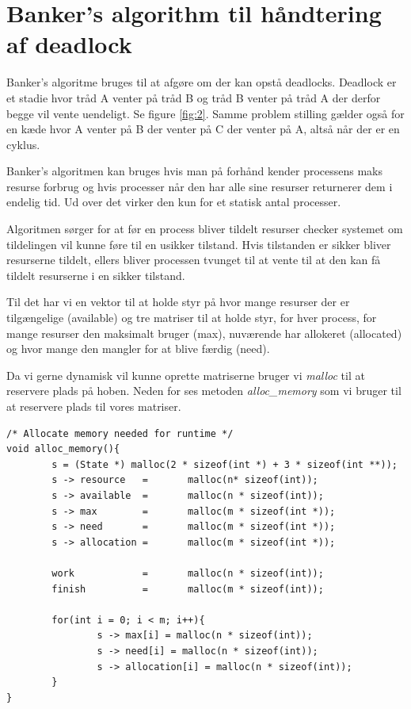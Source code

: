 \documentclass[danish]{report}
\begin{document}
\chapter{Banker’s algorithm til håndtering af deadlock}

Banker's algoritme bruges til at afgøre om der kan opstå deadlocks. Deadlock er et stadie hvor tråd A venter på tråd B og tråd B venter på tråd A der derfor begge vil vente uendeligt. Se figure \ref{fig:2}. Samme problem stilling gælder også for en kæde hvor A venter på B der venter på C der venter på A, altså når der er en cyklus.

Banker's algoritmen kan bruges hvis man på forhånd kender processens maks resurse forbrug og hvis processer når den har alle sine resurser returnerer dem i endelig tid. Ud over det virker den kun for et statisk antal processer.


Algoritmen sørger for at før en process bliver tildelt resurser checker systemet om tildelingen vil kunne føre til en usikker tilstand. Hvis tilstanden er sikker bliver resurserne tildelt, ellers bliver processen tvunget til at vente til at den kan få tildelt resurserne i en sikker tilstand.

Til det har vi en vektor til at holde styr på hvor mange resurser der er tilgængelige (available) og tre matriser til at holde styr, for hver process, for mange resurser den maksimalt bruger (max), nuværende har allokeret (allocated) og hvor mange den mangler for at blive færdig (need).

Da vi gerne dynamisk vil kunne oprette matriserne bruger vi \textit{malloc} 
til at reservere plads på hoben. Neden for ses metoden \textit{alloc\_memory} som vi bruger til at reservere plads til vores matriser. 

\begin{lstlisting}
/* Allocate memory needed for runtime */
void alloc_memory(){
        s = (State *) malloc(2 * sizeof(int *) + 3 * sizeof(int **));
        s -> resource   =       malloc(n* sizeof(int));
        s -> available  =       malloc(n * sizeof(int));
        s -> max        =       malloc(m * sizeof(int *));
        s -> need       =       malloc(m * sizeof(int *));
        s -> allocation =       malloc(m * sizeof(int *));

        work            =       malloc(n * sizeof(int));
        finish          =       malloc(m * sizeof(int));

        for(int i = 0; i < m; i++){
                s -> max[i] = malloc(n * sizeof(int));
                s -> need[i] = malloc(n * sizeof(int));
                s -> allocation[i] = malloc(n * sizeof(int));
        }
}
\end{lstlisting}
\end{document}
